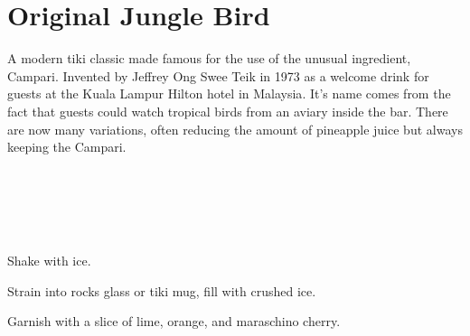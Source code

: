 \section[Jungle Bird]{Original Jungle Bird}

\begin{recipestats}[
	servings=1,
	preptime=5~\minute,
	original=\citefield{originalJungleBird}{title}~\cite{originalJungleBird},
]
\end{recipestats}


\begin{recipeabstract}
	A modern tiki classic made famous for the use of the unusual ingredient, Campari.
	Invented by Jeffrey Ong Swee Teik in 1973 as a welcome drink for guests at the Kuala Lampur Hilton hotel in Malaysia\cite{cocktailSeminars2021}.
	It's name comes from the fact that guests could watch tropical birds from an aviary inside the bar.
	There are now many variations, often reducing the amount of pineapple juice but always keeping the Campari.
\end{recipeabstract}


\begin{ingredientcolumns}[1]
	\begin{ingredientblock}
		\\
		\\
		\\
		\\
	\end{ingredientblock}
\end{ingredientcolumns}


\begin{preparation}
\item Shake with ice.
\item Strain into rocks glass or tiki mug, fill with crushed ice.
\item Garnish with a slice of lime, orange, and maraschino cherry.
\end{preparation}


\recipeend%
